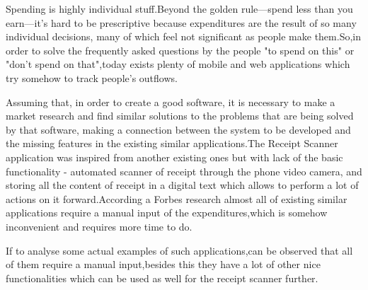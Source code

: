Spending is highly individual stuff.Beyond the golden rule—spend less than you earn—it’s hard to be prescriptive because expenditures are the result of so many individual decisions, many of which feel not significant as people make them.So,in order to solve the frequently asked questions by the people "to spend on this" or "don't spend on that",today exists plenty of mobile and web applications which try somehow to track people's outflows.

 Assuming that, in order to create a good software, it is necessary to make a market research and find similar solutions to the problems that are being solved by that software, making a connection between the system to be developed and the missing features in the existing similar applications.The Receipt Scanner application was inspired from another existing ones but with lack of the basic functionality - automated scanner of receipt through the phone video camera, and storing all the content of receipt in a digital text which allows to perform a lot of actions on it forward.According a Forbes research \cite{Forbes} almost all of existing similar applications require a manual input of the expenditures,which is somehow inconvenient and requires more time to do.

If to analyse some actual examples of such applications,can be observed that all of them require a manual input,besides this they have a lot of other nice functionalities which can be used as well for the receipt scanner further.

